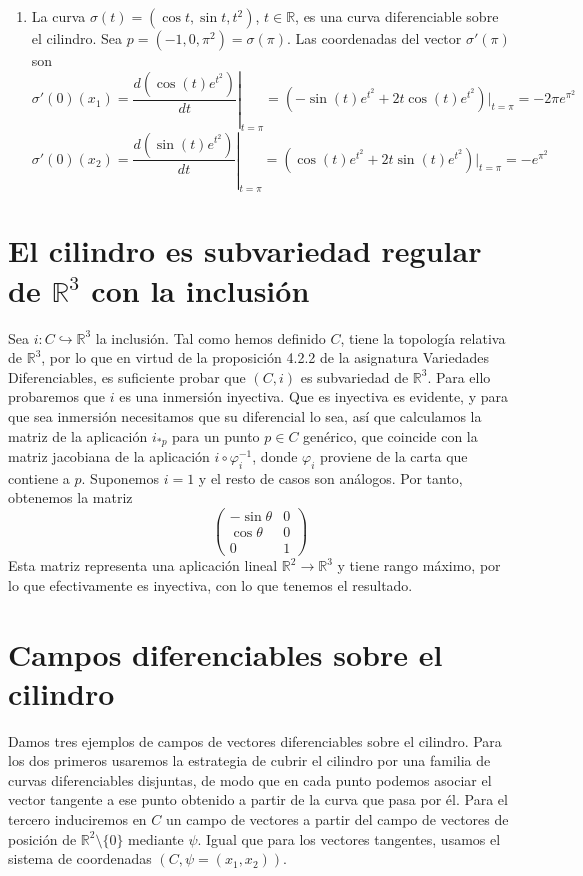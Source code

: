 \documentclass[twoside, 11pt]{article}
\theoremstyle{definition}
\newcommand{\R}{\mathbb{R}}
\begin{document}
\begin{enumerate}
\item La curva $\sigma(t)=(\cos t, \sin t, t^2)$, $t\in\R$, es una curva diferenciable sobre el cilindro. Sea $p=(-1,0,\pi^2)=\sigma(\pi)$. Las coordenadas del vector $\sigma'(\pi)$ son
\[
\sigma'(0)(x_1)=\left.\frac{d(\cos(t) e^{t^2})}{dt}\right|_{t=\pi}=(-\sin(t)e^{t^2}+2t\cos(t)e^{t^2})|_{t=\pi}=-2\pi e^{\pi^2}
\]
\[
\sigma'(0)(x_2)=\left.\frac{d(\sin(t) e^{t^2})}{dt}\right|_{t=\pi}=(\cos(t)e^{t^2}+2t\sin(t)e^{t^2})|_{t=\pi}=-e^{\pi^2}
\]

\end{enumerate}


\section{El cilindro es subvariedad regular de $\R^3$ con la inclusión}


Sea $i:C\hookrightarrow \R^3$ la inclusión. Tal como hemos definido $C$, tiene la topología relativa de $\R^3$, por lo que en virtud de la proposición 4.2.2 de la asignatura Variedades Diferenciables, es suficiente probar que $(C,i)$ es subvariedad de $\R^3$. Para ello probaremos que $i$ es una inmersión inyectiva. Que es inyectiva es evidente, y para que sea inmersión necesitamos que su diferencial lo sea, así que calculamos la matriz de la aplicación $i_{*p}$ para un punto $p\in C$ genérico, que coincide con la matriz jacobiana de la aplicación $i\circ \varphi^{-1}_i$, donde $\varphi_i$ proviene de la carta que contiene a $p$. Suponemos $i=1$ y el resto de casos son análogos. Por tanto, obtenemos la matriz
\[
\begin{pmatrix}
-\sin\theta & 0 \\
\cos\theta & 0\\
0 & 1
\end{pmatrix}
\]
Esta matriz representa una aplicación lineal $\R^2\to\R^3$ y tiene rango máximo, por lo que efectivamente es inyectiva, con lo que tenemos el resultado. 

\section{Campos diferenciables sobre el cilindro}

Damos tres ejemplos de campos de vectores diferenciables sobre el cilindro. Para los dos primeros usaremos la estrategia de cubrir el cilindro por una familia de curvas diferenciables disjuntas, de modo que en cada punto podemos asociar el vector tangente a ese punto obtenido a partir de la curva que pasa por él. Para el tercero induciremos en $C$ un campo de vectores a partir del campo de vectores de posición de $\R^2\setminus\{0\}$ mediante $\psi$. Igual que para los vectores tangentes, usamos el sistema de coordenadas $(C,\psi=(x_1,x_2))$. 
\end{document}
